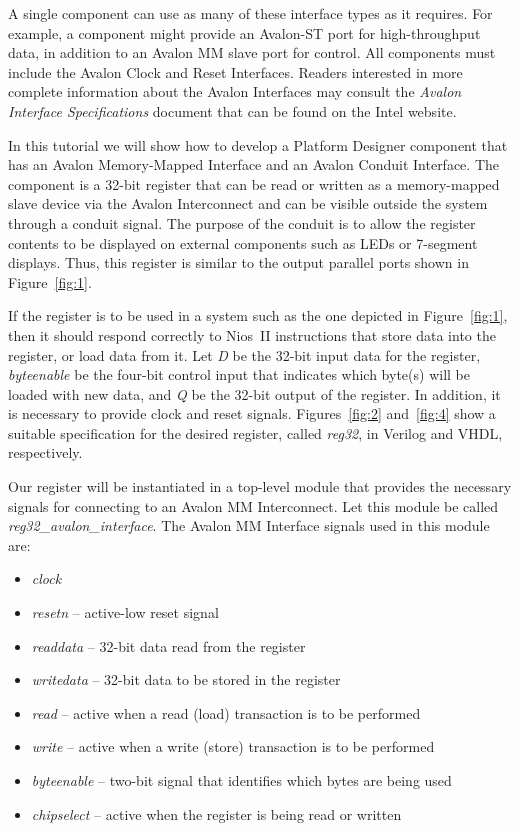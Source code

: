 \documentclass[11pt, twoside, pdftex]{article}
\begin{document}
A single component can use as many of these interface types as it requires. For example, 
a component might provide an Avalon-ST port for high-throughput data, in addition to an 
Avalon MM slave port for control.  All components must include the Avalon Clock and 
Reset Interfaces. Readers interested in more complete information about the Avalon Interfaces 
may consult the {\it Avalon Interface Specifications} document that can be found on 
the Intel website.

In this tutorial we will show how to develop a Platform Designer component that has an Avalon Memory-Mapped 
Interface and an Avalon Conduit Interface. The component is a 32-bit register that can be 
read or written as a memory-mapped slave device via the Avalon Interconnect and can be visible 
outside the system through a conduit signal.  The purpose of the conduit is to allow the 
register contents to be displayed on external components such as LEDs or 7-segment displays.
Thus, this register is similar to the output parallel ports shown in Figure~\ref{fig:1}.

If the register is to be used in a system such as the one depicted in Figure~\ref{fig:1}, 
then it should respond correctly to Nios~II instructions that store data into the register, 
or load data from it.  Let {\it D} be the 32-bit input data for the register, 
{\it byteenable} be the four-bit control input that indicates which byte(s) will be loaded 
with new data, and {\it Q} be the 32-bit output of the register.
In addition, it is necessary to provide clock and reset signals. 
Figures~\ref{fig:2} and~\ref{fig:4} show a suitable specification for the desired register, 
called {\it reg32}, in Verilog and VHDL, respectively.

Our register will be instantiated in a top-level module that provides the necessary
signals for connecting to an Avalon MM Interconnect. Let this module be 
called {\it reg32\_avalon\_interface}.  The Avalon MM Interface signals used in this
module are:
\begin{itemize}
\item {\it clock}
\item {\it resetn} -- active-low reset signal
\item {\it readdata} -- 32-bit data read from the register
\item {\it writedata} -- 32-bit data to be stored in the register
\item {\it read} -- active when a read (load) transaction is to be performed
\item {\it write} -- active when a write (store) transaction is to be performed
\item {\it byteenable} -- two-bit signal that identifies which bytes are being used
\item {\it chipselect} -- active when the register is being read or written
\end{itemize}
\end{document}
